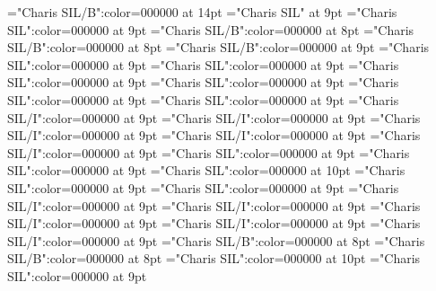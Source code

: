\documentclass[gps1,twoside]{article}
\begin{document}
\font{}="Charis SIL/B":color=000000 at 14pt
\font{}="Charis SIL" at 9pt
\font\entryletDatadicBody="Charis SIL":color=000000 at 9pt
\font\headwordggoTeluINentryletDatadicBody="Charis SIL/B":color=000000 at 8pt
\font\headwordafterentryletDatadicBody="Charis SIL/B":color=000000 at 8pt
\font\spanenheadwordggoTeluINentryletDatadicBody="Charis SIL/B":color=000000 at 9pt
\font\spanentryletDatadicBody="Charis SIL":color=000000 at 9pt
\font\pronunciationggofonipaxemicspanentryletDatadicBody="Charis SIL":color=000000 at 9pt
\font\spanenpronunciationggofonipaxemicspanentryletDatadicBody="Charis SIL":color=000000 at 9pt
\font\spanggofonipaxemicpronunciationggofonipaxemicspanentryletDatadicBody="Charis SIL":color=000000 at 9pt
\font\spanenspanentryletDatadicBody="Charis SIL":color=000000 at 9pt
\font\sensespanentryletDatadicBody="Charis SIL":color=000000 at 9pt
\font\grammaticalinfosensespanentryletDatadicBody="Charis SIL/I":color=000000 at 9pt
\font\grammaticalinfoaftersensespanentryletDatadicBody="Charis SIL/I":color=000000 at 9pt
\font\partofspeechengrammaticalinfosensespanentryletDatadicBody="Charis SIL/I":color=000000 at 9pt
\font\spanenpartofspeechengrammaticalinfosensespanentryletDatadicBody="Charis SIL/I":color=000000 at 9pt
\font\spanengrammaticalinfosensespanentryletDatadicBody="Charis SIL/I":color=000000 at 9pt
\font{}="Charis SIL":color=000000 at 9pt
\font\spanendefinitionensensespanentryletDatadicBody="Charis SIL":color=000000 at 9pt
\font\LexSensepublishStemGlossPubLdtesensespanentryletDatadicBody="Charis SIL":color=000000 at 10pt
\font\spanteLexSensepublishStemGlossPubLdtesensespanentryletDatadicBody="Charis SIL":color=000000 at 9pt
\font\spanenLexSensepublishStemGlossPubLdtesensespanentryletDatadicBody="Charis SIL":color=000000 at 9pt
\font\grammaticalinfospanentryletDatadicBody="Charis SIL/I":color=000000 at 9pt
\font\grammaticalinfoafterspanentryletDatadicBody="Charis SIL/I":color=000000 at 9pt
\font\partofspeechengrammaticalinfospanentryletDatadicBody="Charis SIL/I":color=000000 at 9pt
\font\spanenpartofspeechengrammaticalinfospanentryletDatadicBody="Charis SIL/I":color=000000 at 9pt
\font\spanengrammaticalinfospanentryletDatadicBody="Charis SIL/I":color=000000 at 9pt
\font\xsensenumbersensespanentryletDatadicBody="Charis SIL/B":color=000000 at 8pt
\font\xsensenumberaftersensespanentryletDatadicBody="Charis SIL/B":color=000000 at 8pt
\font\xitemteLexSensepublishStemGlossPubLdtesensespanentryletDatadicBody="Charis SIL":color=000000 at 10pt
\font\spantexitemteLexSensepublishStemGlossPubLdtesensespanentryletDatadicBody="Charis SIL":color=000000 at 9pt
\end{document}
